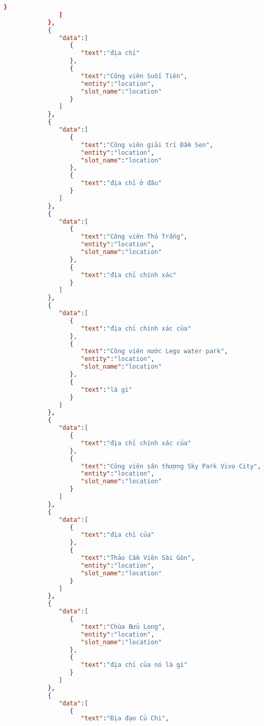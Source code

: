 \begin{lstlisting}[language=json,firstnumber=1]
                  }
               ]
            },
            {
               "data":[
                  {
                     "text":"địa chỉ"
                  },
                  {
                     "text":"Công viên Suối Tiên",
                     "entity":"location",
                     "slot_name":"location"
                  }
               ]
            },
            {
               "data":[
                  {
                     "text":"Công viên giải trí Đầm Sen",
                     "entity":"location",
                     "slot_name":"location"
                  },
                  {
                     "text":"địa chỉ ở đâu"
                  }
               ]
            },
            {
               "data":[
                  {
                     "text":"Công viên Thỏ Trắng",
                     "entity":"location",
                     "slot_name":"location"
                  },
                  {
                     "text":"địa chỉ chính xác"
                  }
               ]
            },
            {
               "data":[
                  {
                     "text":"địa chỉ chính xác của"
                  },
                  {
                     "text":"Công viên nước Lego water park",
                     "entity":"location",
                     "slot_name":"location"
                  },
                  {
                     "text":"là gì"
                  }
               ]
            },
            {
               "data":[
                  {
                     "text":"địa chỉ chính xác của"
                  },
                  {
                     "text":"Công viên sân thượng Sky Park Vivo City",
                     "entity":"location",
                     "slot_name":"location"
                  }
               ]
            },
            {
               "data":[
                  {
                     "text":"địa chỉ của"
                  },
                  {
                     "text":"Thảo Cầm Viên Sài Gòn",
                     "entity":"location",
                     "slot_name":"location"
                  }
               ]
            },
            {
               "data":[
                  {
                     "text":"Chùa Bửu Long",
                     "entity":"location",
                     "slot_name":"location"
                  },
                  {
                     "text":"địa chỉ của nó là gì"
                  }
               ]
            },
            {
               "data":[
                  {
                     "text":"Địa đạo Củ Chi",

\end{lstlisting}
